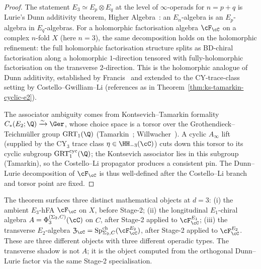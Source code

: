 \begin{proof}
The statement $E_3 \simeq E_p \otimes E_q$ at the level of
$\infty$-operads for $n = p + q$ is Lurie's Dunn additivity theorem,
Higher Algebra~\cite[\S 5.1.2.2]{LurieHA}: an $E_n$-algebra is an
$E_p$-algebra in $E_q$-algebras. For a holomorphic factorisation
algebra $\cF_\cC$ on a complex $n$-fold $X$ (here $n = 3$), the same
decomposition holds on the holomorphic refinement: the full
holomorphic factorisation structure splits as BD-chiral factorisation
along a holomorphic $1$-direction tensored with fully-holomorphic
factorisation on the transverse $2$-direction. This is the
holomorphic analogue of Dunn additivity, established by
Francis~\cite[\S 2]{Francis2013} and extended to the CY-trace-class
setting by Costello--Gwilliam--Li (references as in
Theorem~\ref{thm:ks-tamarkin-cyclic-e2}).

The associator ambiguity comes from Kontsevich--Tamarkin formality
$C_*(E_2; \Q) \xrightarrow{\sim} \Ger$, whose choice space is a torsor
over the Grothendieck--Teichm\"uller group $\mathrm{GRT}_1(\Q)$
(Tamarkin~\cite{TamarkinDGCat}; Willwacher~\cite{Willwacher2015}).
A cyclic $A_\infty$ lift (supplied by the CY$_3$ trace class $\eta \in
\HH_{-3}(\cC)$) cuts down this torsor to its cyclic subgroup
$\mathrm{GRT}_1^{\mathrm{cyc}}(\Q)$; the Kontsevich associator lies in
this subgroup (Tamarkin), so the Costello--Li propagator
\cite[\S 6]{CostelloLi2016} produces a consistent pin. The
Dunn--Lurie decomposition of $\cF_\cC$ is thus well-defined after the
Costello--Li branch and torsor point are fixed.
\end{proof}

\begin{remark}
\label{rem:transverse-three-objects}
The theorem surfaces three distinct mathematical objects at $d = 3$:
(i) the ambient $E_3$-hFA $\cF_\cC$ on $X$, before Stage-2; (ii) the
longitudinal $E_1$-chiral algebra $A = \Phi_3^{(\Sigma_2, C)}(\cC)$ on
$C$, after Stage-2 applied to $\cF^{E_1}_\cC$; (iii) the transverse
$E_2$-algebra $\fZ_\cC = \mathrm{Sp}^{\mathrm{ch}}_{\Sigma_2, C}
(\cF^{E_2}_\cC)$, after Stage-2 applied to $\cF^{E_2}_\cC$. These are
three different objects with three different operadic types. The
transverse shadow is not $A$; it is the object computed from the
orthogonal Dunn--Lurie factor via the same Stage-2 specialisation.
\end{remark}

